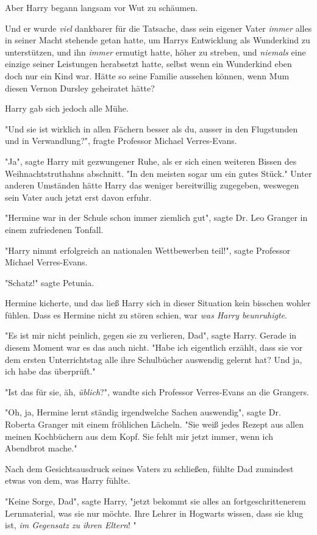 {Aber Harry begann langsam vor Wut zu schäumen.

Und er wurde \emph{viel} dankbarer für die Tatsache, dass sein eigener Vater \emph{immer} alles in seiner Macht stehende getan hatte, um Harrys Entwicklung als Wunderkind zu unterstützen, und ihn \emph{immer} ermutigt hatte, höher zu streben, und \emph{niemals} eine einzige seiner Leistungen herabsetzt hatte, selbst wenn ein Wunderkind eben doch nur ein Kind war. Hätte so seine Familie aussehen können, wenn Mum diesen Vernon Dursley geheiratet hätte?

Harry gab sich jedoch alle Mühe.

"Und sie ist wirklich in allen Fächern besser als du, ausser in den Flugstunden und in Verwandlung?", fragte Professor Michael Verres-Evans.

"Ja", sagte Harry mit gezwungener Ruhe, als er sich einen weiteren Bissen des Weihnachtstruthahns abschnitt. "In den meisten sogar um ein gutes Stück." Unter anderen Umständen hätte Harry das weniger bereitwillig zugegeben, weswegen sein Vater auch jetzt erst davon erfuhr.

"Hermine war in der Schule schon immer ziemlich gut", sagte Dr. Leo Granger in einem zufriedenen Tonfall.

"Harry nimmt erfolgreich an nationalen Wettbewerben teil!", sagte Professor Michael Verres-Evans.

"Schatz!" sagte Petunia.

Hermine kicherte, und das ließ Harry sich in dieser Situation kein bisschen wohler fühlen. Dass es Hermine nicht zu stören schien, war \emph{was Harry beunruhigte}.

"Es ist mir nicht peinlich, gegen sie zu verlieren, Dad", sagte Harry. Gerade in diesem Moment war es das auch nicht. "Habe ich eigentlich erzählt, dass sie vor dem ersten Unterrichtstag alle ihre Schulbücher auswendig gelernt hat? Und ja, ich habe das überprüft."

"Ist das für sie, äh, \emph{üblich}?", wandte sich Professor Verres-Evans an die Grangers.

"Oh, ja, Hermine lernt ständig irgendwelche Sachen auswendig", sagte Dr. Roberta Granger mit einem fröhlichen Lächeln. "Sie weiß jedes Rezept aus allen meinen Kochbüchern aus dem Kopf. Sie fehlt mir jetzt immer, wenn ich Abendbrot mache."

Nach dem Gesichtsausdruck seines Vaters zu schließen, fühlte Dad zumindest etwas von dem, was Harry fühlte.

"Keine Sorge, Dad", sagte Harry, "jetzt bekommt sie alles an fortgeschrittenerem Lernmaterial, was sie nur möchte. Ihre Lehrer in Hogwarts wissen, dass sie klug ist, \emph{im Gegensatz zu ihren Eltern}! "

}
